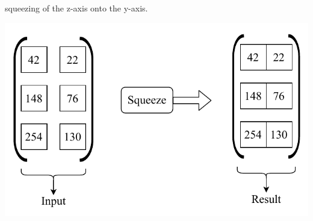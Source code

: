 \documentclass[12pt]{article}
\begin{document}
\begin{blockfigure}{squeezing of the z-axis onto the y-axis.}
	\begin{center}
		\includegraphics[width=\textwidth]{squeeze}
	\end{center}
\end{blockfigure}
\newpage
\end{document}
